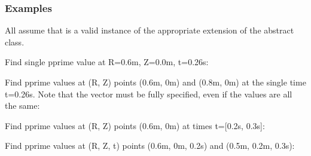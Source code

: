 \documentclass[letterpaper,10pt,english]{sphinxmanual}
\begin{document}
\begin{fulllineitems}
\begin{fulllineitems}
\begin{quote}
\begin{description}
\begin{itemize}
\end{itemize}


\end{description}\end{quote}
\subsubsection*{Examples}

All assume that  is a valid instance of the
appropriate extension of the {\hyperref[\detokenize{eqtools:eqtools.core.Equilibrium}]{}} abstract class.

Find single pprime value at R=0.6m, Z=0.0m, t=0.26s:

\begin{sphinxVerbatim}[commandchars=\\\{\}]
    
\end{sphinxVerbatim}

Find pprime values at (R, Z) points (0.6m, 0m) and (0.8m, 0m) at the
single time t=0.26s. Note that the  vector must be fully specified,
even if the values are all the same:

\begin{sphinxVerbatim}[commandchars=\\\{\}]
  \PYG{p}{[} \PYG{p}{]} \PYG{p}{[} \PYG{p}{]} 
\end{sphinxVerbatim}

Find pprime values at (R, Z) points (0.6m, 0m) at times t={[}0.2s, 0.3s{]}:

\begin{sphinxVerbatim}[commandchars=\\\{\}]
    \PYG{p}{[} \PYG{p}{]}
\end{sphinxVerbatim}

Find pprime values at (R, Z, t) points (0.6m, 0m, 0.2s) and (0.5m, 0.2m, 0.3s):


\end{fulllineitems}
\end{fulllineitems}
\end{document}
